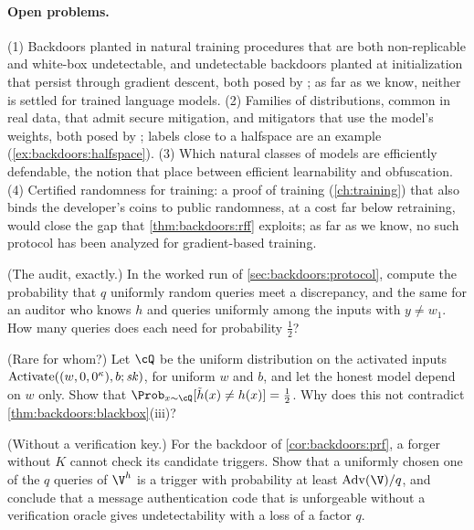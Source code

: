 \begin{refsection}
\paragraph{Open problems.} (1) Backdoors planted in natural training procedures that are both non-replicable and white-box undetectable, and undetectable backdoors planted at initialization that persist through gradient descent, both posed by \textcite{GoldwasserEtAl2022}; as far as we know, neither is settled for trained language models. (2) Families of distributions, common in real data, that admit secure mitigation, and mitigators that use the model's weights, both posed by \textcite[Section~9]{GoldwasserEtAl2025}; labels close to a halfspace are an example (\cref{ex:backdoors:halfspace}). (3) Which natural classes of models are efficiently defendable, the notion that \textcite{ChristianoEtAl2025} place between efficient learnability and obfuscation. (4) Certified randomness for training: a proof of training (\cref{ch:training}) that also binds the developer's coins to public randomness, at a cost far below retraining, would close the gap that \cref{thm:backdoors:rff} exploits; as far as we know, no such protocol has been analyzed for gradient-based training.

\begin{exercises}
\item \consolidation (The audit, exactly.) In the worked run of \cref{sec:backdoors:protocol}, compute the probability that $q$ uniformly random queries meet a discrepancy, and the same for an auditor who knows $h$ and queries uniformly among the inputs with $y\ne w_1$. How many queries does each need for probability $\frac12$?\label{ex:backdoors:worked}

\item \consolidation (Rare for whom?) Let $\cQ$ be the uniform distribution on the activated inputs $\mathrm{Activate}((w,0,0^\kappa),b;\mathit{sk})$, for uniform $w$ and $b$, and let the honest model depend on $w$ only. Show that $\Prob_{x\sim\cQ}[\tilde h(x)\ne h(x)]=\frac12$. Why does this not contradict \cref{thm:backdoors:blackbox}(iii)?\label{ex:backdoors:rare}

\item \consolidation (Without a verification key.) For the backdoor of \cref{cor:backdoors:prf}, a forger without $K$ cannot check its candidate triggers. Show that a uniformly chosen one of the $q$ queries of $\V^h$ is a trigger with probability at least $\backdoorsAdv(\V)/q$, and conclude that a message authentication code that is unforgeable without a verification oracle gives undetectability with a loss of a factor $q$.\label{ex:backdoors:mac}


\end{exercises}
\end{refsection}
